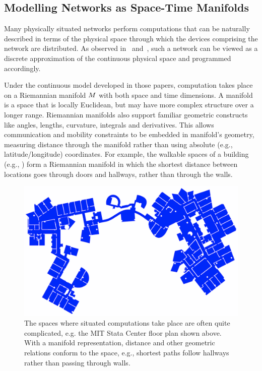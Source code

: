 \documentclass[12pt,a4paper,twoside,openright]{book}
\begin{document}
\subsection{Modelling Networks as Space-Time Manifolds}

Many physically situated networks perform computations that can be naturally described in terms of the physical space through which the devices comprising the network are distributed.
%
As observed in~\cite{upp} and~\cite{bealBasisSCW10}, such a network can be viewed as a discrete approximation of the continuous physical space and programmed accordingly.

Under the continuous model developed in those papers, computation takes place on a Riemannian manifold $M$ with both space and time dimensions.
%
A manifold is a space that is locally Euclidean, but may have more complex structure over a longer range.  Riemannian manifolds also support familiar geometric constructs like angles, lengths, curvature, integrals and derivatives.
%
This allows communication and mobility constraints to be embedded in manifold's geometry, measuring distance through the manifold rather than using absolute (e.g., latitude/longitude) coordinates.
%
For example, the walkable spaces of a building (e.g., ) form a Riemannian manifold in which the shortest distance between locations goes through doors and hallways, rather than through the walls.

\begin{figure}
\centering
\includegraphics[width=\columnwidth]{img/32_D5}
\caption[MIT Stata Center floor plan]{The spaces where situated computations take place are often quite complicated, e.g. the MIT Stata Center floor plan shown above. 
         With a manifold representation, distance and other geometric relations conform to the space, e.g., shortest paths follow hallways rather than passing through walls.}
\label{f:manifold}
\end{figure}
\end{document}
